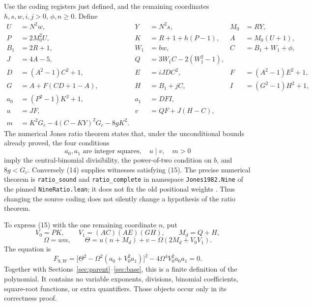\documentclass[11pt]{article}
\theoremstyle{definition}\newtheorem{definition}[theorem]{Definition}
\begin{document}
Use the coding registers just defined, and the remaining coordinates
$h,s,w,i,j>0$, $\phi,n\geq0$. Define
\begin{align*}
U&=N^2w,&Y&=N^2s,&M_0&=RY,\\
P&=2M_0^2U,&K&=R+1+h(P-1),&A&=M_0(U+1),\\
B_1&=2R+1,&W_1&=bw,&C&=B_1+W_1+\phi,\\
J&=4A-5,&Q&=3W_1C-2(W_1^2-1),\\
D&=(A^2-1)C^2+1,&E&=iJDC^2,&F&=(A^2-1)E^2+1,\\
G&=A+F(CD+1-A),&H&=B_1+jC,&I&=(G^2-1)H^2+1,\\
a_0&=(P^2-1)K^2+1,&a_1&=DFI,\\
u&=JF,&v&=QF+J(H-C),\\
m&=K^2G_c-4(C-KY)^2G_c-8gK^2.
\end{align*}
The numerical Jones ratio theorem states that, under the unconditional
bounds already proved, the four conditions
\[
 a_0,a_1\text{ are integer squares},\quad u\mid v,\quad m>0
 \tag{15}\label{eq:ratio}
\]
imply the central-binomial divisibility, the power-of-two condition on
$b$, and $8g<G_c$. Conversely (14) supplies witnesses satisfying (15).
The precise numerical theorem is
\texttt{ratio\_sound} and \texttt{ratio\_complete} in namespace
\texttt{Jones1982.Nine} of the pinned \texttt{NineRatio.lean};
it does not fix the old positional weights
\cite{jones,ratio}. Thus changing the source coding does not silently
change a hypothesis of the ratio theorem.

To express (15) with the one remaining coordinate $n$, put
\[
 V_0=PK,\qquad V_1=(AC)(AE)(GH),\qquad M_d=Q+H,
\]
\[
 \Omega=um,\qquad
 \Theta=u(n+M_d)+v-\Omega(2M_d+V_0V_1).
\]
The equation is
\[
 \boxed{\ F_{9,W}=
 \bigl[\Theta^2-\Omega^2(a_0+V_0^2a_1)\bigr]^2
 -4\Omega^4V_0^2a_0a_1=0.\ }                    \tag{16}\label{eq:F9}
\]
Together with Sections~\ref{sec:parent}--\ref{sec:base}, this is a
finite definition of the polynomial. It contains no variable exponents,
divisions, binomial coefficients, square-root functions, or extra
quantifiers. Those objects occur only in its correctness proof.
\end{document}
